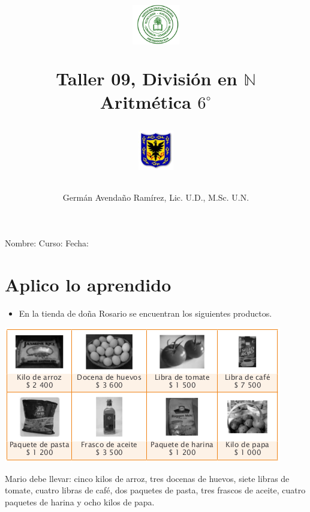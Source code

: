 \documentclass[letterpaper,11pt,twoside]{article}
\author{Germ\'an Avenda\~no Ram\'irez, Lic. U.D., M.Sc. U.N.}
\title{\begin{minipage}{.2\textwidth}
\includegraphics[height=1.75cm]{Images/logo-colegio.png}\end{minipage}
\begin{minipage}{.55\textwidth}
\begin{center}
Taller 09, Divisi\'{o}n en $\mathbb{N}$\\
Aritm\'{e}tica $6^{\circ}$
\end{center}
\end{minipage}\hfill
\begin{minipage}{.2\textwidth}
\includegraphics[height=1.75cm]{Images/logo-sed.png} 
\end{minipage}}
\date{}
\begin{document}
\maketitle
Nombre: \hrulefill Curso: \underline{\hspace*{44pt}} Fecha: \underline{\hspace*{2.5cm}}
 \section*{Aplico lo aprendido}
 \begin{itemize}
 \item En la tienda de doña Rosario se encuentran los
siguientes productos.
\end{itemize}
\begin{center}
\includegraphics[scale=.76]{Images/productos.png} 
\end{center}
Mario debe llevar: cinco kilos de arroz, tres docenas de
huevos, siete libras de tomate, cuatro libras de café, dos
paquetes de pasta, tres frascos de aceite, cuatro paquetes
de harina y ocho kilos de papa.
\end{document}
